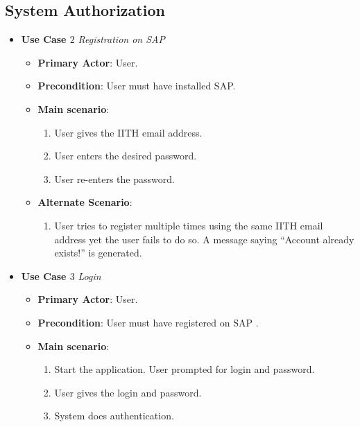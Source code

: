 \documentclass{report}
\begin{document}
\subsection{System Authorization}
\begin{tcolorbox}[colframe=white, colback=lightred, arc=8pt]
\begin{itemize}
    \item \textbf{Use Case $2$} \textit{Registration on SAP
}\\
    \begin{itemize}
        \item \textbf{Primary Actor}: User.
        \item \textbf{Precondition}: User must have installed SAP.
        \item \textbf{Main scenario}: \begin{enumerate}
            \item User gives the IITH email address.
            \item User enters the desired password. 
            \item User re-enters the password. 
        \end{enumerate}
       \item \textbf{Alternate Scenario}: 
       \begin{enumerate}
           \item User tries to register multiple times using the same IITH email address yet the user fails to do so. A message saying “Account already exists!” is generated.
       \end{enumerate}
    \end{itemize}
\end{itemize}
\begin{itemize}
    \item \textbf{Use Case $3$} \textit{Login
}\\
    \begin{itemize}
        \item \textbf{Primary Actor}: User.
        \item \textbf{Precondition}: User must have registered on SAP
.
        \item \textbf{Main scenario}: \begin{enumerate}
            \item Start the application. User prompted for login and password. 
            \item User gives the login and password.
            \item System does authentication.

\end{enumerate}
\end{itemize}
\end{itemize}
\end{tcolorbox}
\end{document}
